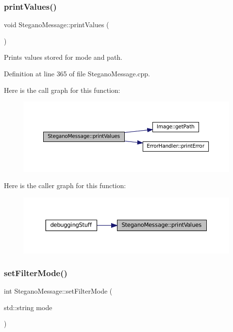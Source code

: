 \subsubsection{\texorpdfstring{printValues()}{printValues()}}
{\footnotesize\ttfamily void Stegano\+Message\+::print\+Values (\begin{DoxyParamCaption}{ }\end{DoxyParamCaption})}



Prints values stored for mode and path. 



Definition at line 365 of file Stegano\+Message.\+cpp.

Here is the call graph for this function\+:
\nopagebreak
\begin{figure}[H]
\begin{center}
\leavevmode
\includegraphics[width=350pt]{classSteganoMessage_a3ea3f5ff720bf56d33f168d47e2897b0_cgraph}
\end{center}
\end{figure}
Here is the caller graph for this function\+:
\nopagebreak
\begin{figure}[H]
\begin{center}
\leavevmode
\includegraphics[width=350pt]{classSteganoMessage_a3ea3f5ff720bf56d33f168d47e2897b0_icgraph}
\end{center}
\end{figure}
\mbox{\label{classSteganoMessage_a5c3ef910b17f4bbe32a73a33be9d7586}} 
\subsubsection{\texorpdfstring{setFilterMode()}{setFilterMode()}}
{\footnotesize\ttfamily int Stegano\+Message\+::set\+Filter\+Mode (\begin{DoxyParamCaption}\item[{std\+::string}]{mode }\end{DoxyParamCaption})}



